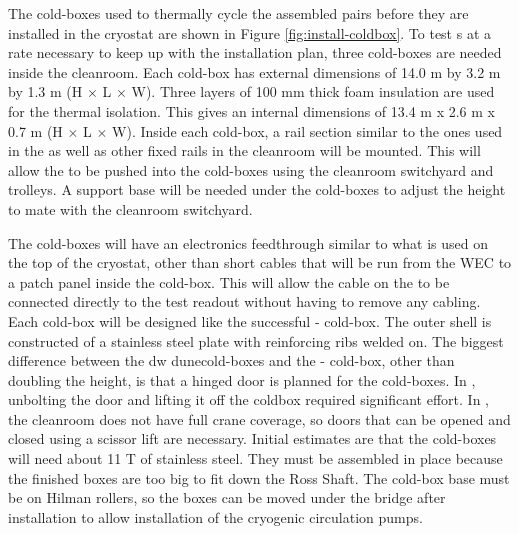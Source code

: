 The cold-boxes used to thermally cycle the assembled  pairs before they are installed in the cryostat are shown in Figure \ref{fig:install-coldbox}. 
To test s at a rate necessary to keep up with the installation plan, three cold-boxes are needed inside the cleanroom. 
Each cold-box has external dimensions of 14.0 \si{m} by 3.2 \si{m} by 1.3 \si{m} (H $\times$ L $\times$ W). 
Three layers of 100 \si{mm} thick foam insulation are used for the thermal isolation. 
This gives an internal dimensions of 13.4 \si{m} x 2.6 \si{m} x 0.7 \si{m} (H $\times$ L $\times$ W). 
Inside each cold-box, a rail section similar to the ones used in the  as well as other fixed rails in the cleanroom will be mounted.
This will allow the  to be pushed into the cold-boxes using the cleanroom switchyard and trolleys. 
A support base will be needed under the cold-boxes to adjust the height to mate with the cleanroom switchyard.

The cold-boxes will have an electronics feedthrough similar to what is used on the top of the  cryostat, other than short cables that will be run from the WEC  to a patch panel inside the cold-box.
This will allow the cable on the  to be connected directly to the test readout without having to remove any cabling. 
Each cold-box will be designed like the successful - cold-box. 
The outer shell is constructed of a stainless steel plate with reinforcing ribs welded on. 
The biggest difference between the 
dw
dunecold-boxes and the - cold-box, other than doubling the height, is that a hinged door is planned for the  cold-boxes. 
In , unbolting the door and lifting it off the coldbox required significant effort. 
In , the cleanroom does not have full crane coverage, so doors that can be opened and closed using a scissor lift are necessary.
Initial estimates are that the  cold-boxes will need about 11 \si{T} of stainless steel. 
They must be assembled in place because the finished boxes are too big to fit down the Ross Shaft. 
The cold-box base must be on Hilman rollers, so the boxes can be moved under the bridge after installation to allow installation of the cryogenic circulation pumps.
 





